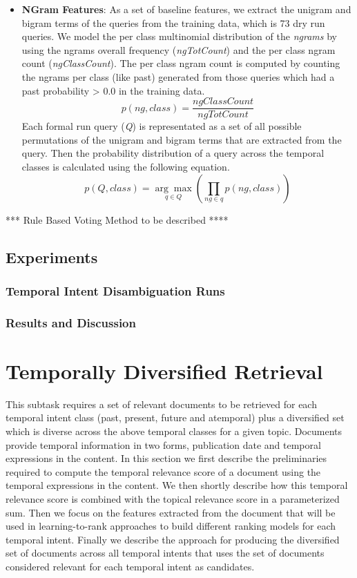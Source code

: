 \documentclass{sig-alternate}
\begin{document}
\begin{itemize}
\item\textbf{NGram Features}:
As a set of baseline features, we extract the unigram and bigram terms of the queries from the training data, which is 73 dry run queries. We model the per class multinomial distribution of the \textit{ngrams} by using the ngrams overall frequency (\textit{ngTotCount}) and the per class ngram count (\textit{ngClassCount}). The per class ngram count is computed by counting the ngrams per class (like past) generated from those queries which had a past probability > 0.0 in the training data.
\begin{equation}\label{eq:1}
p(ng, class) = \frac{ngClassCount}{ngTotCount}
\end{equation}
Each formal run query (\textit{Q}) is representated as a set of all possible permutations of the unigram and bigram terms that are extracted from the query. Then the probability distribution of a query across the temporal classes is calculated using the following equation.
\begin{equation}\label{eq:2}
p(Q,class) =\underset{q\in Q}{\arg\max}(\prod_{ng \in q}p(ng, class))
\end{equation}
\end{itemize}
*** Rule Based Voting Method to be described ****
\subsection{Experiments}
\subsubsection{Temporal Intent Disambiguation Runs}
\subsubsection{Results and Discussion}
\section{Temporally Diversified Retrieval}
This subtask requires a set of relevant documents to be retrieved for each temporal intent class (past, present, future and atemporal) plus a diversified set which is diverse across the above temporal classes for a given topic. Documents provide temporal information in two forms, publication date and temporal expressions in the content. In this section we first describe the preliminaries required to compute the temporal relevance score of a document using the temporal expressions in the content. We then shortly describe how this temporal relevance score is combined with the topical relevance score in a parameterized sum. Then we focus on the features extracted from the document that will be used in learning-to-rank approaches to build different ranking models for each temporal intent. Finally we describe the approach for producing the diversified set of documents across all temporal intents that uses the set of documents considered relevant for each temporal intent as candidates. 
\end{document}
